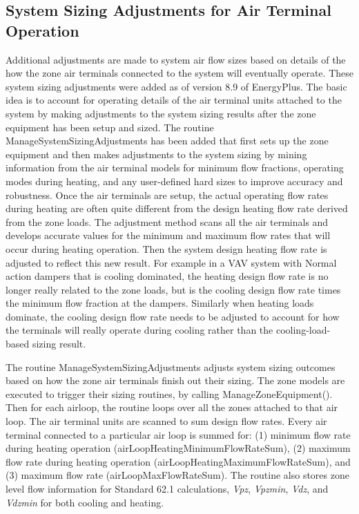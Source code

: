 \subsection{System Sizing Adjustments for Air Terminal Operation}\label{system-sizing-adjustments-for-air-terminal-operation}

Additional adjustments are made to system air flow sizes based on details of the how the zone air terminals connected to the system will eventually operate.  These system sizing adjustments were added as of version 8.9 of EnergyPlus.  The basic idea is to account for operating details of the air terminal units attached to the system by making adjustments to the system sizing results after the zone equipment has been setup and sized.  The routine ManageSystemSizingAdjustments has been added that first sets up the zone equipment and then makes adjustments to the system sizing by mining information from the air terminal models for minimum flow fractions, operating modes during heating, and any user-defined hard sizes to improve accuracy and robustness.  Once the air terminals are setup, the actual operating flow rates during heating are often quite different from the design heating flow rate derived from the zone loads.  The adjustment method scans all the air terminals and develops accurate values for the minimum and maximum flow rates that will occur during heating operation.  Then the system design heating flow rate is adjusted to reflect this new result.  For example in a VAV system with Normal action dampers that is cooling dominated, the heating design flow rate is no longer really related to the zone loads, but is the cooling design flow rate times the minimum flow fraction at the dampers. Similarly when heating loads dominate, the cooling design flow rate needs to be adjusted to account for how the terminals will really operate during cooling rather than the cooling-load-based sizing result.

The routine ManageSystemSizingAdjustments adjusts system sizing outcomes based on how the zone air terminals finish out their sizing. The zone models are executed to trigger their sizing routines, by calling ManageZoneEquipment(). Then for each airloop, the routine loops over all the zones attached to that air loop. The air terminal units are scanned to sum design flow rates. Every air terminal connected to a particular air loop is summed for: (1) minimum flow rate during heating operation (airLoopHeatingMinimumFlowRateSum), (2) maximum flow rate during heating operation (airLoopHeatingMaximumFlowRateSum), and (3) maximum flow rate (airLoopMaxFlowRateSum). The routine also stores zone level flow information for Standard 62.1 calculations, \emph{Vpz}, \emph{Vpzmin}, \emph{Vdz}, and \emph{Vdzmin} for both cooling and heating.

